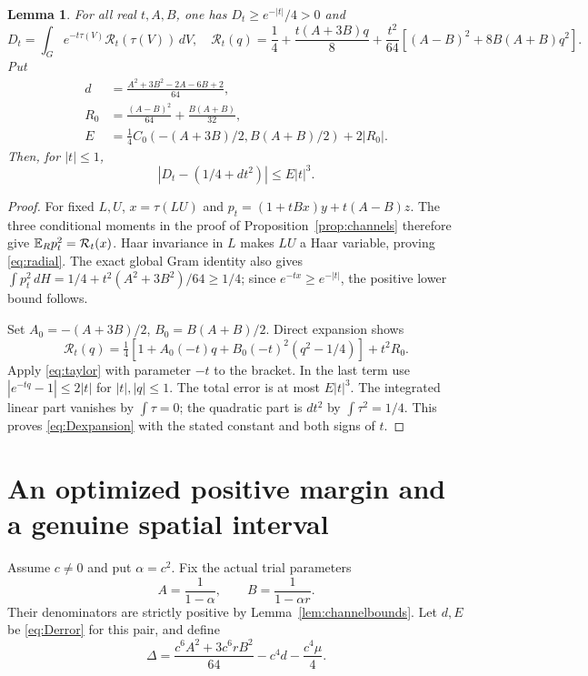 \documentclass[11pt]{article}
\newtheorem{lemma}[theorem]{Lemma}
\begin{document}
\begin{lemma}\label{lem:denominator}
For all real $t,A,B$, one has $D_t\geq e^{-|t|}/4>0$ and
\begin{equation}\label{eq:radial}
 D_t=\int_G e^{-t\tau(V)}\mathcal R_t(\tau(V))\,dV,
 \quad \mathcal R_t(q)=\frac14+\frac{t(A+3B)q}{8}
 +\frac{t^2}{64}[(A-B)^2+8B(A+B)q^2].
\end{equation}
Put
\begin{align}
 d&=\frac{A^2+3B^2-2A-6B+2}{64},\nonumber\\
 R_0&=\frac{(A-B)^2}{64}+\frac{B(A+B)}{32},\nonumber\\
 E&=\frac14C_0(-(A+3B)/2,B(A+B)/2)+2|R_0|.\label{eq:Derror}
\end{align}
Then, for $|t|\leq1$,
\begin{equation}\label{eq:Dexpansion}
 |D_t-(1/4+dt^2)|\leq E|t|^3.
\end{equation}
\end{lemma}
\begin{proof}
For fixed $L,U$, $x=\tau(LU)$ and
$p_t=(1+tBx)y+t(A-B)z$. The three conditional moments in the proof
of Proposition~\ref{prop:channels} therefore give
$\mathbb E_Rp_t^2=\mathcal R_t(x)$. Haar invariance in $L$ makes $LU$
a Haar variable, proving \eqref{eq:radial}.
The exact global Gram identity also gives
$\int p_t^2\,dH=1/4+t^2(A^2+3B^2)/64\geq1/4$;
since $e^{-tx}\geq e^{-|t|}$, the positive lower bound follows.

Set $A_0=-(A+3B)/2$, $B_0=B(A+B)/2$. Direct expansion shows
\[
 \mathcal R_t(q)=\tfrac14[1+A_0(-t)q+B_0(-t)^2(q^2-1/4)]
                  +t^2R_0.
\]
Apply \eqref{eq:taylor} with parameter $-t$ to the bracket.
In the last term use $|e^{-tq}-1|\leq2|t|$ for $|t|,|q|\leq1$.
The total error is at most $E|t|^3$. The integrated linear part
vanishes by $\int\tau=0$; the quadratic part is $dt^2$ by
$\int\tau^2=1/4$. This proves \eqref{eq:Dexpansion} with the stated
constant and both signs of $t$.
\end{proof}

\section{An optimized positive margin and a genuine spatial interval}
Assume $c\ne0$ and put $\alpha=c^2$. Fix the actual trial parameters
\begin{equation}\label{eq:AB}
 A=\frac1{1-\alpha},\qquad B=\frac1{1-\alpha r}.
\end{equation}
Their denominators are strictly positive by Lemma~\ref{lem:channelbounds}.
Let $d,E$ be \eqref{eq:Derror} for this pair, and define
\begin{equation}\label{eq:margin}
 \Delta=\frac{c^6A^2+3c^6rB^2}{64}-c^4d-\frac{c^4\mu}{4}.
\end{equation}
\end{document}
